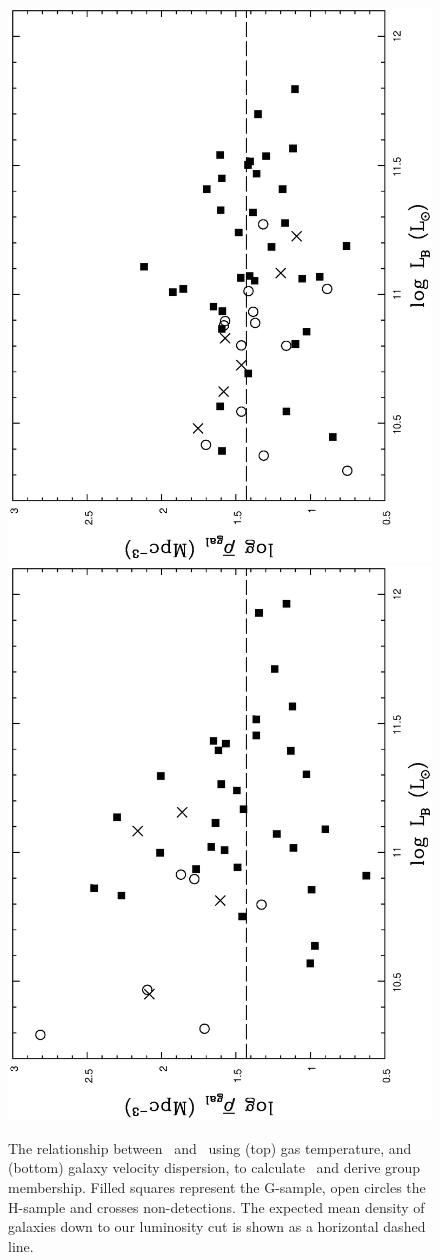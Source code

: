 \documentclass[usenatbib]{mn2e}
\begin{document}
\begin{figure}

  \includegraphics[height=\linewidth,angle=270]{fig_11a.ps}
  \includegraphics[height=\linewidth,angle=270]{fig_11b.ps}
  \caption{The relationship between \dengal\ and \LB\ using (top) gas temperature,
           and (bottom) galaxy velocity dispersion, to calculate \rfh\ and derive
           group membership.  Filled squares represent the G-sample, open circles
           the H-sample and crosses non-detections.  The expected mean density of
           galaxies down to our luminosity cut is shown as a horizontal dashed
           line.}
  \label{fig_dengal_LB}

\end{figure}
\end{document}
